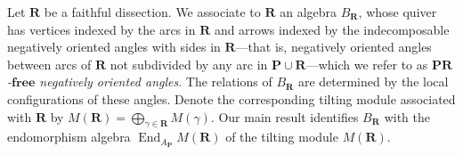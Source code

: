\documentclass[a4paper,10pt]{amsart}
\theoremstyle{plain}          %
\newtheorem{theorem}{Theorem}[section]
\theoremstyle{definition}
\def\SS{\mathbf{S}}
\def\RR{\mathbf{R}}
\def\Pf{\mathbf{P}}
\def\MM{\mathbf{M}}
\def\PP{\mathbf{P}}
\def\MM{\mathbf{M}}
\newcommand{\I}{\operatorname{(I)}}
\newcommand{\V}{\operatorname{(V)}}
\newcommand{\apfree}{\angle^-_{\mathbf{P-free}}}
\newcommand{\FD}{\mathbf{FD}}
\newcommand{\PD}{\mathbf{PD}}
\newcommand{\D}{\mathbf{D}}
\newcommand{\End}{\operatorname{End}\nolimits}
\begin{document}
Let $\RR$ be a faithful dissection. We associate to $\RR$ an algebra $B_{\RR}$, whose quiver has vertices indexed by the arcs in $\RR$ and arrows indexed by the indecomposable negatively oriented angles with sides in $\RR$---that is, negatively oriented angles between arcs of $\RR$ not subdivided by any arc in $\PP\cup\RR$---which we refer to as \emph{$\PP\RR$-$\mathbf{free}$ negatively oriented angles}.
The relations of $B_{\RR}$ are determined by the local configurations of these angles. Denote the corresponding tilting module associated with $\RR$ by $M(\RR)=\bigoplus_{\gamma\in\RR}M(\gamma).$
  Our main result identifies $B_\RR$ with the endomorphism algebra $\End_{A_{\PP}}M(\RR)$ of the tilting module $M(\RR)$.


\end{document}
